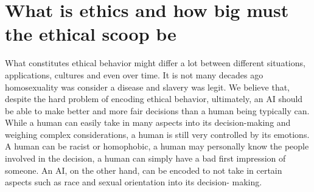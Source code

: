 \documentclass[11pt]{article}
\begin{document}
\section{What is ethics and how big must the ethical scoop be}
What constitutes ethical behavior might differ a
lot between different situations, applications, cultures and even over time. 
It is not many decades ago homosexuality was consider a disease and slavery was legit.
We believe that, despite the hard problem of encoding ethical behavior,
ultimately, an AI should be able to make better and more fair decisions than a
human being typically can. While a human can easily take in many aspects into
its decision-making and weighing complex considerations, a human is still very
controlled by its emotions. A human can be racist or homophobic, a human may
personally know the people involved in the decision, a human can simply have a
bad first impression of someone. An AI, on the other hand, can be encoded to not
take in certain aspects such as race and sexual orientation into its decision-
making. 

\end{document}
